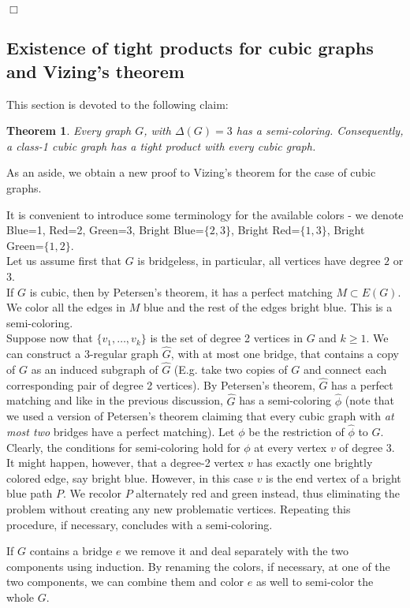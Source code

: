 \documentclass[12pt]{article}
\newtheorem{theorem}{Theorem}[section]
\newtheorem{open question}[theorem]{Open question}
\newcommand{\proof}{{\par\noindent {\bf Proof}\space\space}}
\newcommand{\proofbox}{\begin{flushright}$\Box$\end{flushright}}
\begin{document}
\proofbox



\subsection{Existence of tight products for cubic graphs and Vizing's theorem}\label{odd regularity}
This section is devoted to the following claim:
\begin{theorem}\label{theorem:3-clorable-graph-has-a-tight-product-with-every-cubic-graph}
Every graph $G$, with $\Delta(G)=3$ has a semi-coloring. Consequently, a class-1 cubic graph has a tight product with {\em every} cubic graph.
\end{theorem}
As an aside, we obtain a new proof to Vizing's theorem for the case of cubic graphs. 
\proof
It is convenient to introduce some terminology for the available colors - we denote Blue=1, Red=2, Green=3, Bright Blue=$\{ 2 , 3 \}$, Bright Red=$\{1,3\}$, Bright Green=$\{1,2\}$.\\
Let us assume first that $G$ is bridgeless, in particular, all vertices have degree $2$ or $3$.\\
If $G$ is cubic, then by Petersen's theorem, it has a perfect matching $M\subset E(G)$. We color all the edges in $M$ blue and the rest of the edges bright blue. This is a semi-coloring.\\
Suppose now that $\{v_1,\ldots ,v_k\}$ is
the set of degree 2 vertices in $G$ and $k\ge 1$. We can construct a $3$-regular graph $\hat{G}$, with at most one bridge, that contains a copy of $G$ as an induced subgraph of $\hat{G}$ (E.g. take two copies of $G$ and connect each corresponding pair of
degree 2 vertices). By Petersen's theorem, $\hat{G}$ has a perfect matching and like in the previous discussion, $\hat{G}$ has a semi-coloring $\hat{\phi}$ (note that we used a version of Petersen's theorem claiming that every cubic graph with {\em at most two} bridges have a perfect matching). Let $\phi$ be the restriction of $\hat{\phi}$ to $G$. Clearly, the conditions for semi-coloring  hold for $\phi$ at every vertex $v$ of degree 3. It might happen, however, that a degree-2 vertex $v$ has exactly one brightly colored edge, say bright blue. However, in this case $v$ is the end vertex of a bright blue path $P$. We recolor $P$ alternately red and green instead, thus eliminating the problem without creating any new problematic vertices. Repeating this procedure, if necessary, concludes with a semi-coloring.

If $G$ contains a bridge $e$ we remove it and deal separately with the two components using induction. By renaming the colors, if necessary, at one of the two components, we can combine them and color $e$ as well to semi-color the whole $G$.
\end{document}
